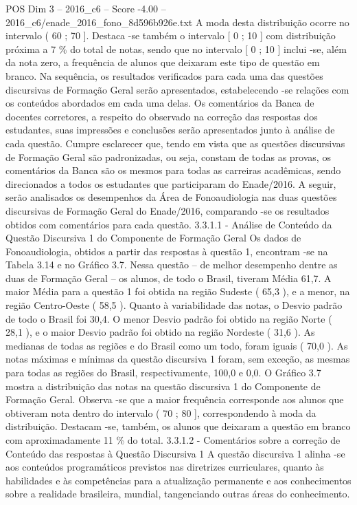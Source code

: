 \begin{textsample}{POS Dim 3 – 2016\_c6 – Score -4.00 – 2016\_c6/enade\_2016\_fono\_8d596b926e.txt}
A moda desta distribuição ocorre no intervalo ( 60 ; 70 ].
Destaca -se também o intervalo [ 0 ; 10 ] com distribuição próxima a 7 \% do total de notas, sendo que no intervalo [ 0 ; 10 ] inclui -se, além da nota zero, a frequência de alunos que deixaram este tipo de questão em branco.
Na sequência, os resultados verificados para cada uma das questões discursivas de Formação Geral serão apresentados, estabelecendo -se relações com os conteúdos abordados em cada uma delas.
Os comentários da Banca de docentes corretores, a respeito do observado na correção das respostas dos estudantes, suas impressões e conclusões serão apresentados junto à análise de cada questão.
Cumpre esclarecer que, tendo em vista que as questões discursivas de Formação Geral são padronizadas, ou seja, constam de todas as provas, os comentários da Banca são os mesmos para todas as carreiras acadêmicas, sendo direcionados a todos os estudantes que participaram do Enade/2016.
A seguir, serão analisados os desempenhos da Área de Fonoaudiologia nas duas questões discursivas de Formação Geral do Enade/2016, comparando -se os resultados obtidos com comentários para cada questão. 3.3.1.1 - Análise de Conteúdo da Questão Discursiva 1 do Componente de Formação Geral Os dados de Fonoaudiologia, obtidos a partir das respostas à questão 1, encontram -se na Tabela 3.14 e no Gráfico 3.7.
Nessa questão – de melhor desempenho dentre as duas de Formação Geral – os alunos, de todo o Brasil, tiveram Média 61,7.
A maior Média para a questão 1 foi obtida na região Sudeste ( 65,3 ), e a menor, na região Centro-Oeste ( 58,5 ).
Quanto à variabilidade das notas, o Desvio padrão de todo o Brasil foi 30,4.
O menor Desvio padrão foi obtido na região Norte ( 28,1 ), e o maior Desvio padrão foi obtido na região Nordeste ( 31,6 ).
As medianas de todas as regiões e do Brasil como um todo, foram iguais ( 70,0 ).
As notas máximas e mínimas da questão discursiva 1 foram, sem exceção, as mesmas para todas as regiões do Brasil, respectivamente, 100,0 e 0,0.
O Gráfico 3.7 mostra a distribuição das notas na questão discursiva 1 do Componente de Formação Geral.
Observa -se que a maior frequência corresponde aos alunos que obtiveram nota dentro do intervalo ( 70 ; 80 ], correspondendo à moda da distribuição.
Destacam -se, também, os alunos que deixaram a questão em branco com aproximadamente 11 \% do total. 3.3.1.2 - Comentários sobre a correção de Conteúdo das respostas à Questão Discursiva 1 A questão discursiva 1 alinha -se aos conteúdos programáticos previstos nas diretrizes curriculares, quanto às habilidades e às competências para a atualização permanente e aos conhecimentos sobre a realidade brasileira, mundial, tangenciando outras áreas do conhecimento.

\end{textsample}
